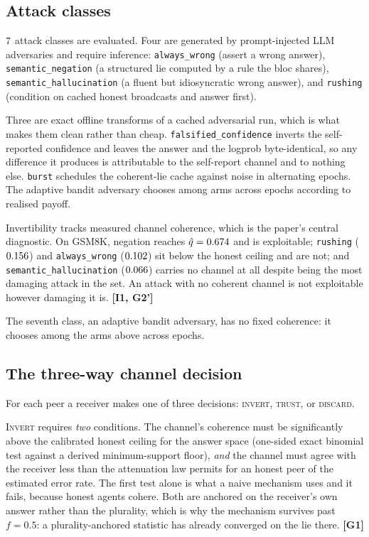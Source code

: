 \subsection{Attack classes}

$7$ attack classes are evaluated. Four are generated by
prompt-injected LLM adversaries and require inference:
\texttt{always\_wrong} (assert a wrong answer), \texttt{semantic\_negation} (a
structured lie computed by a rule the bloc shares), \texttt{semantic\_hallucination}
(a fluent but idiosyncratic wrong answer), and \texttt{rushing} (condition on
cached honest broadcasts and answer first).

Three are exact offline transforms of a cached adversarial run, which is what
makes them clean rather than cheap. \texttt{falsified\_confidence} inverts the
self-reported confidence and leaves the answer and the logprob byte-identical, so
any difference it produces is attributable to the self-report channel and to
nothing else. \texttt{burst} schedules the coherent-lie cache against noise in
alternating epochs. The adaptive bandit adversary chooses among arms across
epochs according to realised payoff.

Invertibility tracks measured channel coherence, which is the paper's central
diagnostic. On GSM8K, negation reaches $\hat q = 0.674$ and is
exploitable; \texttt{rushing} ($0.156$) and \texttt{always\_wrong}
($0.102$) sit below the honest ceiling and are not; and
\texttt{semantic\_hallucination} ($0.066$) carries no channel
at all despite being the most damaging attack in the set. An attack with no
coherent channel is not exploitable however damaging it is. \textbf{[I1, G2']}


The seventh class, an adaptive bandit adversary, has no fixed coherence: it
chooses among the arms above across epochs.

\subsection{The three-way channel decision}

For each peer a receiver makes one of three decisions: \textsc{invert},
\textsc{trust}, or \textsc{discard}.

\textsc{Invert} requires \emph{two} conditions. The channel's coherence must be
significantly above the calibrated honest ceiling for the answer space (one-sided
exact binomial test against a derived minimum-support floor), \emph{and} the
channel must agree with the receiver less than the attenuation law permits for an
honest peer of the estimated error rate. The first test alone is what a naive
mechanism uses and it fails, because honest agents cohere. Both are anchored on
the receiver's own answer rather than the plurality, which is why the mechanism
survives past $f=0.5$: a plurality-anchored statistic has already converged on
the lie there. \textbf{[G1]}

